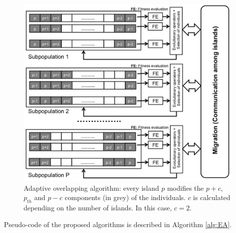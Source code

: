 \documentclass[preprint]{elsarticle}
\begin{document}
\begin{figure}[h!tb]
\centering
\includegraphics[width=12cm]{islandAdaptive.jpg}
\caption{Adaptive overlapping algorithm: every island $p$ modifies the  $p+c$,
  $p_{th}$ and $p-c$  components (in grey) of the individuals. $c$ is calculated depending on the number of islands. In this case, $c=2$.}
  \label{fig:adaptive}
\end{figure}

Pseudo-code of the proposed algorithms is described in Algorithm \ref{alg:EA}.
\end{document}
